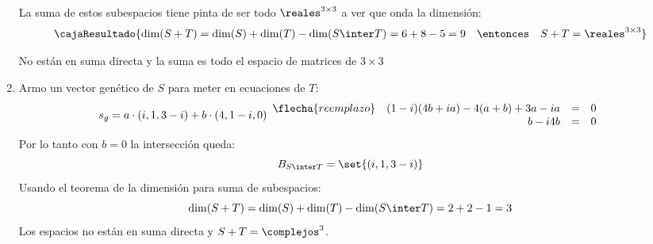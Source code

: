 \begin{enumerate}[label=(\alph*)]
        La suma de estos subespacios tiene pinta de ser todo $\reales^{3 \times 3}$ a ver que onda la dimensión:
        $$
          \cajaResultado{
            \dim(S + T) = \dim(S) + \dim(T) - \dim(S \inter T) = 6 + 8 - 5 = 9
            \quad
            \entonces
            \quad
            S+T = \reales^{3 \times 3}
          }
        $$

        No están en suma directa y la suma es todo el espacio de matrices de $3 \times 3$

  \item
        Armo un vector genético de $S$ para meter en ecuaciones de $T$:
        $$
          s_g = a \cdot (i, 1, 3 - i) + b \cdot (4,1 - i, 0)
          \begin{array}{lrll}
            \flecha{reemplazo} & (1 - i)(4b + ia) - 4(a + b) + 3a - ia & = & 0 \\
                               & b - i4b                               & = & 0
          \end{array}
        $$
        Por lo tanto con $b = 0$ la intersección queda:
        $$
          B_{S \inter T} = \set{(i, 1, 3-i)}
        $$
        Usando el teorema de la dimensión para suma de subespacios:
        $$
          \dim(S + T) = \dim(S) + \dim(T) - \dim(S \inter T) = 2 + 2 - 1 = 3\\
        $$
        Los espacios no están en suma directa y $S+T = \complejos^3$.

        \bigskip
\end{enumerate}

\begin{aportes}
  \item {}
\end{aportes}
